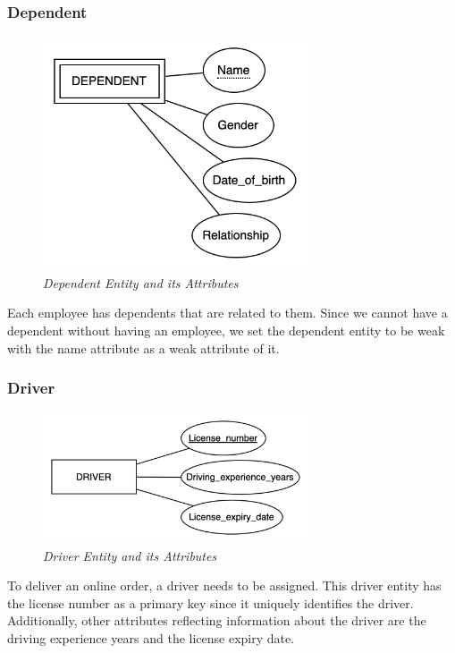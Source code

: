 \subsubsection{Dependent}
\begin{figure}[H]
  \centering
  \includegraphics[width=0.7\textwidth]{images/entities/dependent.png}
  \caption{\textit{Dependent Entity and its Attributes}}
\end{figure}

Each employee has dependents that are related to them. Since we cannot have a dependent without having an employee, we set the dependent entity to be weak with the name attribute as a weak attribute of it.

\subsubsection{Driver}
\begin{figure}[H]
  \centering
  \includegraphics[width=0.7\textwidth]{images/entities/driver.png}
  \caption{\textit{Driver Entity and its Attributes}}
\end{figure}

To deliver an online order, a driver needs to be assigned. This driver entity has the license number as a primary key since it uniquely identifies the driver. Additionally, other attributes reflecting information about the driver are the driving experience years and the license expiry date.

